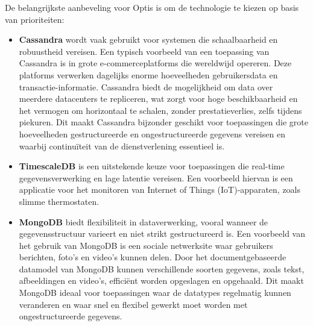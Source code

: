 De belangrijkste aanbeveling voor Optis is om de technologie te kiezen op basis van prioriteiten:
\begin{itemize}
    \item \textbf{Cassandra} wordt vaak gebruikt voor systemen die schaalbaarheid en robuustheid vereisen. Een typisch voorbeeld van een toepassing van Cassandra is in grote e-commerceplatforms die wereldwijd opereren. Deze platforms verwerken dagelijks enorme hoeveelheden gebruikersdata en transactie-informatie. Cassandra biedt de mogelijkheid om data over meerdere datacenters te repliceren, wat zorgt voor hoge beschikbaarheid en het vermogen om horizontaal te schalen, zonder prestatieverlies, zelfs tijdens piekuren. Dit maakt Cassandra bijzonder geschikt voor toepassingen die grote hoeveelheden gestructureerde en ongestructureerde gegevens vereisen en waarbij continuïteit van de dienstverlening essentieel is.
    \item \textbf{TimescaleDB} is een uitstekende keuze voor toepassingen die real-time gegevensverwerking en lage latentie vereisen. Een voorbeeld hiervan is een applicatie voor het monitoren van Internet of Things (IoT)-apparaten, zoals slimme thermostaten.  
    \item \textbf{MongoDB} biedt flexibiliteit in dataverwerking, vooral wanneer de gegevensstructuur varieert en niet strikt gestructureerd is. Een voorbeeld van het gebruik van MongoDB is een sociale netwerksite waar gebruikers berichten, foto's en video's kunnen delen. Door het documentgebaseerde datamodel van MongoDB kunnen verschillende soorten gegevens, zoals tekst, afbeeldingen en video's, efficiënt worden opgeslagen en opgehaald. Dit maakt MongoDB ideaal voor toepassingen waar de datatypes regelmatig kunnen veranderen en waar snel en flexibel gewerkt moet worden met ongestructureerde gegevens.
\end{itemize}



